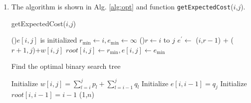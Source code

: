 \documentclass[12pt,a4paper]{article}
\makeatletter
\newtheorem*{solution}{Solution}
\theoremstyle{definition}
\renewenvironment{solution}[1][Solution] {\par\pushQED{\qed}\normalfont\topsep6\p@\@plus6\p@\relax\trivlist\item[\hskip\labelsep\bfseries#1\@addpunct{.}]\ignorespaces}{\popQED\endtrivlist\@endpefalse} \makeatother
\makeatother
\begin{document}
\begin{enumerate}
\begin{enumerate}
\begin{solution}
			The algorithm is shown in Alg. \ref{alg:opt} and function \texttt{getExpectedCost}($i$,$j$).

			\begin{function}[h]
				\caption{getExpectedCost($i$,$j$)}
				\BlankLine
				\lIf(){$e[i,j]$ is initialized}{}
				$r_{\text{min}}\leftarrow i, e_{\text{min}}\leftarrow \infty$\;
				\For(){$r\leftarrow i$ to $j$}{
					$e^\prime\leftarrow$ \getExpectedCost($i$,$r-1$) + \getExpectedCost($r+1,j$)+$w[i,j]$\;
				}
				$root[i,j]\leftarrow r_\text{min},e[i,j]\leftarrow e_\text{min}$\;
				\;
			\end{function}
			\begin{algorithm}[h]
				\caption{Find the optimal binary search tree}
				\label{alg:opt}
				\BlankLine
				Initialize $w[i,j]=\sum_{l=i}^jp_l+\sum_{l=i-1}^jq_l$\;
				Initialize $e[i,i-1]=q_j$\;
				Initialize $root[i,i-1]=i-1$\;
				\getExpectedCost(1,$n$)
			\end{algorithm}
				


\end{solution}
\end{enumerate}
\end{enumerate}
\end{document}

